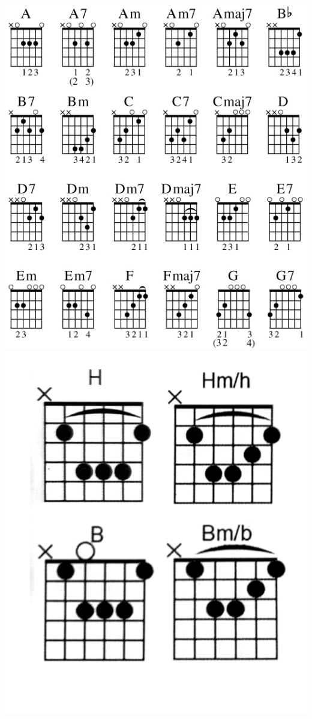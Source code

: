 \thispagestyle{empty}
\flushleft\includegraphics[height=\textheight]{imgs/akordi}
\includegraphics[]{imgs/nemskiAkordi}
\pagebreak


